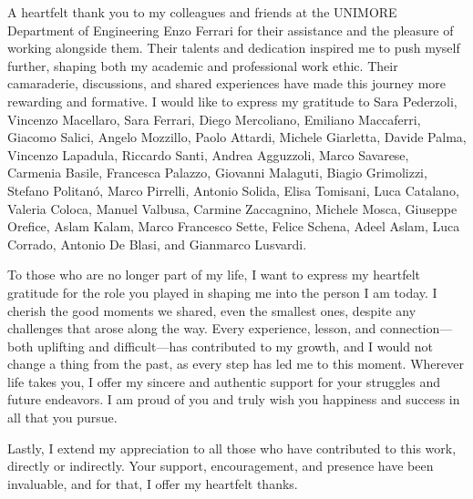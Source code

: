 A heartfelt thank you to my colleagues and friends at the UNIMORE Department of Engineering Enzo Ferrari for their assistance and the pleasure of working alongside them. Their talents and dedication inspired me to push myself further, shaping both my academic and professional work ethic. Their camaraderie, discussions, and shared experiences have made this journey more rewarding and formative. I would like to express my gratitude to Sara Pederzoli, Vincenzo Macellaro, Sara Ferrari, Diego Mercoliano, Emiliano Maccaferri, Giacomo Salici, Angelo Mozzillo, Paolo Attardi, Michele Giarletta, Davide Palma, Vincenzo Lapadula, Riccardo Santi, Andrea Agguzzoli, Marco Savarese, Carmenia Basile, Francesca Palazzo, Giovanni Malaguti, Biagio Grimolizzi, Stefano Politanó, Marco Pirrelli, Antonio Solida, Elisa Tomisani, Luca Catalano, Valeria Coloca, Manuel Valbusa, Carmine Zaccagnino, Michele Mosca, Giuseppe Orefice, Aslam Kalam, Marco Francesco Sette, Felice Schena, Adeel Aslam, Luca Corrado, Antonio De Blasi, and Gianmarco Lusvardi.

To those who are no longer part of my life, I want to express my heartfelt gratitude for the role you played in shaping me into the person I am today. I cherish the good moments we shared, even the smallest ones, despite any challenges that arose along the way. Every experience, lesson, and connection—both uplifting and difficult—has contributed to my growth, and I would not change a thing from the past, as every step has led me to this moment. Wherever life takes you, I offer my sincere and authentic support for your struggles and future endeavors. I am proud of you and truly wish you happiness and success in all that you pursue.

Lastly, I extend my appreciation to all those who have contributed to this work, directly or indirectly. Your support, encouragement, and presence have been invaluable, and for that, I offer my heartfelt thanks.

